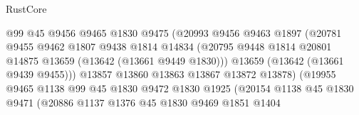 \begin{lexlean}{RustCore}
\begin{coremodule}
                                      @99
                                      @45
                                      @9456
                                      @9465
                                      @1830
                                      @9475
                                      (@20993
                                        @9456
                                        @9463
                                        @1897
                                        (@20781
                                          @9455
                                          @9462
                                          @1807
                                          @9438
                                          @1814
                                          @14834
                                          (@20795
                                            @9448
                                            @1814
                                            @20801
                                            @14875
                                            @13659
                                            (@13642 (@13661 @9449 @1830)))
                                          @13659
                                          (@13642 (@13661 @9439 @9455)))
                                        @13857
                                        @13860
                                        @13863
                                        @13867
                                        @13872
                                        @13878)
                                      (@19955
                                        @9465
                                        @1138
                                        @99
                                        @45
                                        @1830
                                        @9472
                                        @1830
                                        @1925
                                        (@20154
                                          @1138
                                          @45
                                          @1830
                                          @9471
                                          (@20886
                                            @1137
                                            @1376
                                            @45
                                            @1830
                                            @9469
                                            @1851
                                            @1404

\end{coremodule}
\end{lexlean}
